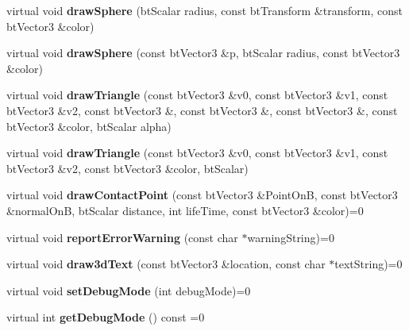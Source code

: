 \begin{DoxyCompactItemize}
virtual void {\bfseries draw\+Sphere} (bt\+Scalar radius, const bt\+Transform \&transform, const bt\+Vector3 \&color)
\item 
\mbox{\label{classbtIDebugDraw_a49e2bf7b122f241b7b29913888d6825b}} 
virtual void {\bfseries draw\+Sphere} (const bt\+Vector3 \&p, bt\+Scalar radius, const bt\+Vector3 \&color)
\item 
\mbox{\label{classbtIDebugDraw_a3f0eec1b40109254182f0fe35f6308d0}} 
virtual void {\bfseries draw\+Triangle} (const bt\+Vector3 \&v0, const bt\+Vector3 \&v1, const bt\+Vector3 \&v2, const bt\+Vector3 \&, const bt\+Vector3 \&, const bt\+Vector3 \&, const bt\+Vector3 \&color, bt\+Scalar alpha)
\item 
\mbox{\label{classbtIDebugDraw_ae537cc49a9061703ec1f1be33cf24ea3}} 
virtual void {\bfseries draw\+Triangle} (const bt\+Vector3 \&v0, const bt\+Vector3 \&v1, const bt\+Vector3 \&v2, const bt\+Vector3 \&color, bt\+Scalar)
\item 
\mbox{\label{classbtIDebugDraw_a791eba72577f83519499bd646bb4a3f1}} 
virtual void {\bfseries draw\+Contact\+Point} (const bt\+Vector3 \&Point\+OnB, const bt\+Vector3 \&normal\+OnB, bt\+Scalar distance, int life\+Time, const bt\+Vector3 \&color)=0
\item 
\mbox{\label{classbtIDebugDraw_a4114a426d9d922d7b834673bb4044757}} 
virtual void {\bfseries report\+Error\+Warning} (const char $\ast$warning\+String)=0
\item 
\mbox{\label{classbtIDebugDraw_a287102dad359ae7c0685ec527c54ea48}} 
virtual void {\bfseries draw3d\+Text} (const bt\+Vector3 \&location, const char $\ast$text\+String)=0
\item 
\mbox{\label{classbtIDebugDraw_a682fb01e96403d1da04207b7a9b46639}} 
virtual void {\bfseries set\+Debug\+Mode} (int debug\+Mode)=0
\item 
\mbox{\label{classbtIDebugDraw_a8b0e36c47552ec81ea61a16f6239f92d}} 
virtual int {\bfseries get\+Debug\+Mode} () const =0
\item 
\mbox{\label{classbtIDebugDraw_ae60d3fc7f75c75712261d970dbd87fb9}} 

\end{DoxyCompactItemize}
